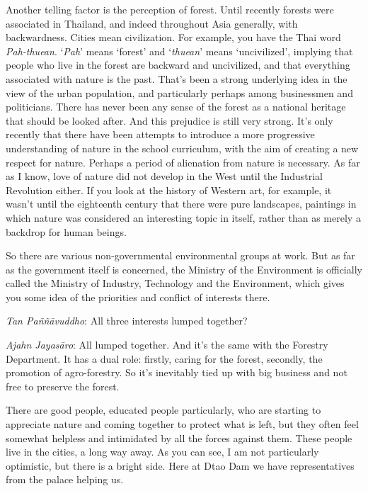 Another telling factor is the perception of forest. Until recently
forests were associated in Thailand, and indeed throughout Asia
generally, with backwardness. Cities mean civilization. For example, you
have the Thai word \emph{Pah-thuean}. `\emph{Pah}' means `forest' and
`\emph{thuean}' means `uncivilized', implying that people who live in
the forest are backward and uncivilized, and that everything associated
with nature is the past. That's been a strong underlying idea in the
view of the urban population, and particularly perhaps among businessmen
and politicians. There has never been any sense of the forest as a
national heritage that should be looked after. And this prejudice is
still very strong. It's only recently that there have been attempts to
introduce a more progressive understanding of nature in the school
curriculum, with the aim of creating a new respect for nature. Perhaps a
period of alienation from nature is necessary. As far as I know, love of
nature did not develop in the West until the Industrial Revolution
either. If you look at the history of Western art, for example, it
wasn't until the eighteenth century that there were pure landscapes, 
paintings in which nature was considered an interesting topic in itself, 
rather than as merely a backdrop for human beings. 

So there are various non-governmental environmental groups at work. But
as far as the government itself is concerned, the Ministry of the
Environment is officially called the Ministry of Industry, Technology
and the Environment, which gives you some idea of the priorities and
conflict of interests there. 

\emph{Tan Paññāvuddho}: All three interests lumped together? 

\emph{Ajahn Jayasāro}: All lumped together. And it's the same with the
Forestry Department. It has a dual role: firstly, caring for the forest, 
secondly, the promotion of agro-forestry. So it's inevitably tied up
with big business and not free to preserve the forest. 

There are good people, educated people particularly, who are starting to
appreciate nature and coming together to protect what is left, but they
often feel somewhat helpless and intimidated by all the forces against
them. These people live in the cities, a long way away. As you can see, 
I am not particularly optimistic, but there is a bright side. Here at
Dtao Dam we have representatives from the palace helping us. 

